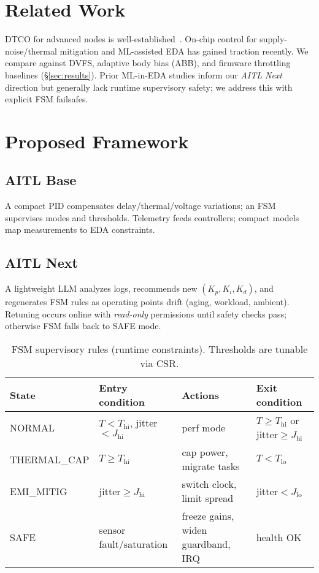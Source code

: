 \documentclass[conference]{IEEEtran}
\begin{document}
\section{Related Work}
DTCO for advanced nodes is well-established~\cite{yakimets,irds}. On-chip control for supply-noise/thermal mitigation and ML-assisted EDA has gained traction recently. We compare against DVFS, adaptive body bias (ABB), and firmware throttling baselines (\S\ref{sec:results}). Prior ML-in-EDA studies inform our \emph{AITL Next} direction but generally lack runtime supervisory safety; we address this with explicit FSM failsafes.

\section{Proposed Framework}
\subsection{AITL Base}
A compact PID compensates delay/thermal/voltage variations; an FSM supervises modes and thresholds. Telemetry feeds controllers; compact models map measurements to EDA constraints.

\subsection{AITL Next}
A lightweight LLM analyzes logs, recommends new $(K_p,K_i,K_d)$, and regenerates FSM rules as operating points drift (aging, workload, ambient). Retuning occurs online with \emph{read-only} permissions until safety checks pass; otherwise FSM falls back to SAFE mode.

\begin{table}[t]
\centering
\caption{FSM supervisory rules (runtime constraints). Thresholds are tunable via CSR.}
\label{tab:fsm}
\begin{tabular}{@{}llll@{}}
\toprule
State & Entry condition & Actions & Exit condition \\
\midrule
NORMAL & $T<T_{\text{hi}}$, jitter$<J_{\text{hi}}$ &
perf mode & $T\ge T_{\text{hi}}$ or jitter$\ge J_{\text{hi}}$ \\
THERMAL\_CAP & $T\ge T_{\text{hi}}$ &
cap power, migrate tasks & $T<T_{\text{lo}}$ \\
EMI\_MITIG & jitter$\ge J_{\text{hi}}$ &
switch clock, limit spread & jitter$<J_{\text{lo}}$ \\
SAFE & sensor fault/saturation &
freeze gains, widen guardband, IRQ & health OK \\
\bottomrule
\end{tabular}
\end{table}
\end{document}

